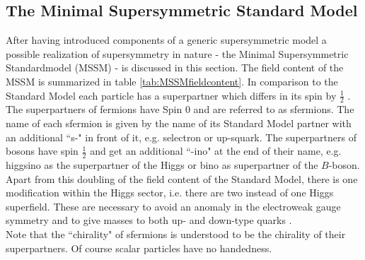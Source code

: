\subsection{The Minimal Supersymmetric Standard Model}
After having introduced components of a generic supersymmetric model a possible realization of supersymmetry in nature - the Minimal Supersymmetric Standardmodel (MSSM) - is discussed in this section. 
The field content of the MSSM is summarized in table \ref{tab:MSSMfieldcontent}. In comparison to the Standard Model each particle has a superpartner which differs in its spin by $\frac{1}{2}$ . The superpartners of fermions have Spin 0 and are referred to as sfermions. The name of each sfermion is given by the name of its Standard Model partner with an additional ``s-" in front of it, e.g. selectron or up-squark. The superpartners of bosons have spin $\frac{1}{2}$ and get an additional ``-ino" at the end of their name, e.g. higgsino as the superpartner of the Higgs or bino as superpartner of the $B$-boson.\\
Apart from this doubling of the field content of the Standard Model, there is one modification within the Higgs sector, i.e. there are two instead of one Higgs superfield. These are necessary to avoid an anomaly in the electroweak gauge symmetry and to give masses to both up- and down-type quarks \cite[page 8]{Martin:1997ns}.\\
Note that the ``chirality" of sfermions is understood to be the chirality of their superpartners. Of course scalar particles have no handedness.
